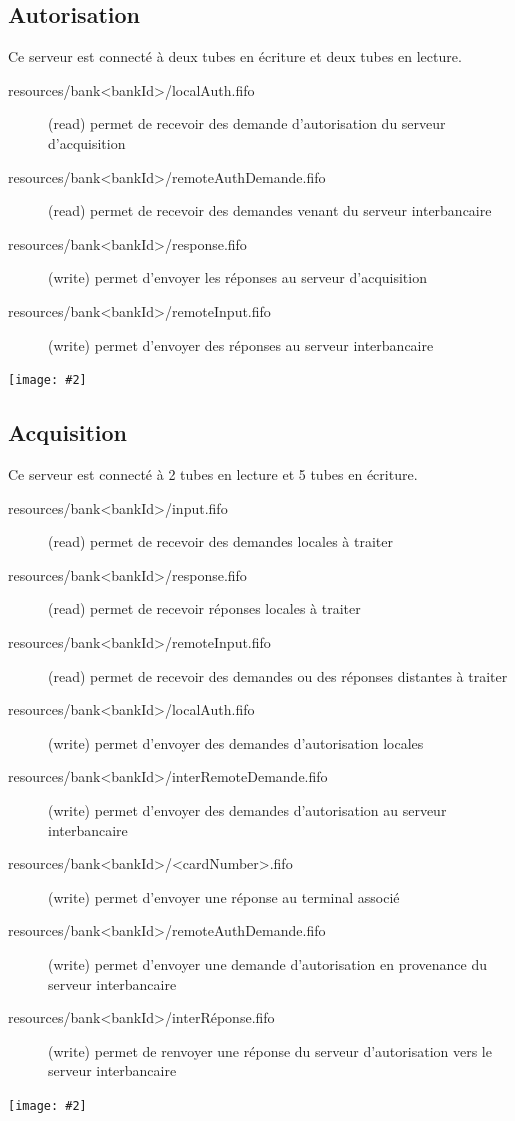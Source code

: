 \documentclass[french, a4paper, 12pt, titlepage]{article}
\newcommand{\graph}[2]{
\medskip
	\begin{center}
		\texttt{[image: \#2]}
	\end{center}
\medskip
}
\begin{document}
\subsection{Autorisation}
Ce serveur est connecté à deux tubes en écriture et deux tubes en lecture.
\begin{description}
	\item[resources/bank<bankId>/localAuth.fifo] (read) permet de recevoir des demande d'autorisation du serveur d'acquisition
	\item[resources/bank<bankId>/remoteAuthDemande.fifo] (read) permet de recevoir des demandes venant du serveur interbancaire
	\item[resources/bank<bankId>/response.fifo] (write) permet d'envoyer les réponses au serveur d'acquisition
	\item[resources/bank<bankId>/remoteInput.fifo] (write) permet d'envoyer des réponses au serveur interbancaire
\end{description}
\graph{0.5}{autorisation}
\subsection{Acquisition}
Ce serveur est connecté à 2 tubes en lecture et 5 tubes en écriture.
\begin{description}
	\item[resources/bank<bankId>/input.fifo] (read) permet de recevoir des demandes locales à traiter
	\item[resources/bank<bankId>/response.fifo] (read) permet de recevoir réponses locales à traiter
	\item[resources/bank<bankId>/remoteInput.fifo] (read) permet de recevoir des demandes ou des réponses distantes à traiter
	\item[resources/bank<bankId>/localAuth.fifo] (write) permet d'envoyer des demandes d'autorisation locales
	\item[resources/bank<bankId>/interRemoteDemande.fifo] (write) permet d'envoyer des demandes d'autorisation au serveur interbancaire
	\item[resources/bank<bankId>/<cardNumber>.fifo] (write) permet d'envoyer une réponse au terminal associé
	\item[resources/bank<bankId>/remoteAuthDemande.fifo] (write) permet d'envoyer une demande d'autorisation en provenance du serveur interbancaire
	\item[resources/bank<bankId>/interRéponse.fifo] (write) permet de renvoyer une réponse du serveur d'autorisation vers le serveur interbancaire
\end{description}
\graph{0.5}{acquisition}
\end{document}
